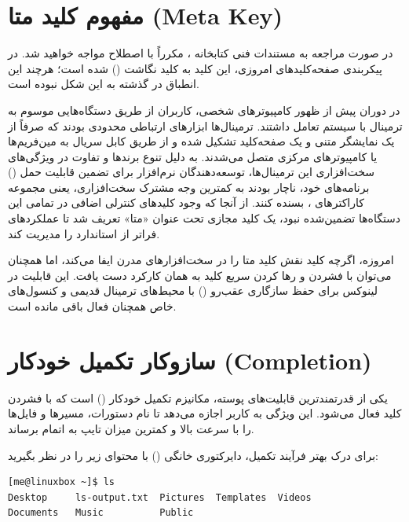 \section{مفهوم کلید متا (Meta Key)}

در صورت مراجعه به مستندات فنی کتابخانه ، مکرراً با اصطلاح  مواجه خواهید شد. در پیکربندی صفحه‌کلیدهای امروزی، این کلید به کلید  نگاشت () شده است؛ هرچند این انطباق در گذشته به این شکل نبوده است.

در دوران پیش از ظهور کامپیوترهای شخصی، کاربران از طریق دستگاه‌هایی موسوم به ترمینال با سیستم تعامل داشتند. ترمینال‌ها ابزارهای ارتباطی محدودی بودند که صرفاً از یک نمایشگر متنی و یک صفحه‌کلید تشکیل شده و از طریق کابل سریال به مین‌فریم‌ها یا کامپیوترهای مرکزی متصل می‌شدند. به دلیل تنوع برندها و تفاوت در ویژگی‌های سخت‌افزاری این ترمینال‌ها، توسعه‌دهندگان نرم‌افزار برای تضمین قابلیت حمل () برنامه‌های خود، ناچار بودند به کمترین وجه مشترک سخت‌افزاری، یعنی مجموعه کاراکترهای ، بسنده کنند. از آنجا که وجود کلیدهای کنترلی اضافی در تمامی این دستگاه‌ها تضمین‌شده نبود، یک کلید مجازی تحت عنوان «متا» تعریف شد تا عملکردهای فراتر از استاندارد را مدیریت کند.

امروزه، اگرچه کلید  نقش کلید متا را در سخت‌افزارهای مدرن ایفا می‌کند، اما همچنان می‌توان با فشردن و رها کردن سریع کلید  به همان کارکرد دست یافت. این قابلیت در لینوکس برای حفظ سازگاری عقب‌رو () با محیط‌های ترمینال قدیمی و کنسول‌های خاص همچنان فعال باقی مانده است.

\section{سازوکار تکمیل خودکار (Completion)}

یکی از قدرتمندترین قابلیت‌های پوسته، مکانیزم تکمیل خودکار () است که با فشردن کلید  فعال می‌شود. این ویژگی به کاربر اجازه می‌دهد تا نام دستورات، مسیرها و فایل‌ها را با سرعت بالا و کمترین میزان تایپ به اتمام برساند.

برای درک بهتر فرآیند تکمیل، دایرکتوری خانگی () با محتوای زیر را در نظر بگیرید:

\begin{latin}
\begin{lstlisting}
[me@linuxbox ~]$ ls
Desktop     ls-output.txt  Pictures  Templates  Videos
Documents   Music          Public
\end{lstlisting}
\end{latin}

